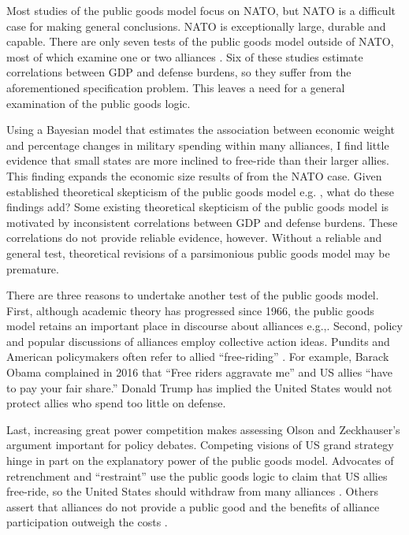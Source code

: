 \documentclass[12pt]{article}
\begin{document}
Most studies of the public goods model focus on NATO, but NATO is a difficult case for making general conclusions. 
NATO is exceptionally large, durable and capable. 
There are only seven tests of the public goods model outside of NATO, most of which examine one or two alliances \citep{Russett1970, Starr1974, Reisinger1983, Thies1987, ConybeareSandler1990, OnealWhatley1996, Siroky2012}. 
Six of these studies estimate correlations between GDP and defense burdens, so they suffer from the aforementioned specification problem.
This leaves a need for a general examination of the public goods logic. 


Using a Bayesian model that estimates the association between economic weight and percentage changes in military spending within many alliances, I find little evidence that small states are more inclined to free-ride than their larger allies.
This finding expands the economic size results of \citep{PluemperNeumayer2015} from the NATO case.
Given established theoretical skepticism of the public goods model e.g. \citep{Palmer1990, GatesTerasawa1992, SandlerHartley2001, Norrlof2010, NiouZeigler2019}, what do these findings add? 
Some existing theoretical skepticism of the public goods model is motivated by inconsistent correlations between GDP and defense burdens. 
These correlations do not provide reliable evidence, however. 
Without a reliable and general test, theoretical revisions of a parsimonious public goods model may be premature.


There are three reasons to undertake another test of the public goods model. 
First, although academic theory has progressed since 1966, the public goods model retains an important place in discourse about alliances e.g.,\citep{Walt1990, Sandler1993, Mearsheimer1994, Goldstein1995, SandlerHartley2001, Garfinkel2004, Walt2009, Norrlof2010, Barrett2010, PluemperNeumayer2015}.
Second, policy and popular discussions of alliances employ collective action ideas.
Pundits and American policymakers often refer to allied ``free-riding'' \citep{Lanoszka2015}.   
For example, Barack Obama complained in 2016 that ``Free riders aggravate me'' and US allies ``have to pay your fair share.'' 
Donald Trump has implied the United States would not protect allies who spend too little on defense. 


Last, increasing great power competition makes assessing Olson and Zeckhauser's argument important for policy debates. 
Competing visions of US grand strategy hinge in part on the explanatory power of the public goods model. 
Advocates of retrenchment and ``restraint'' use the public goods logic to claim that US allies free-ride, so the United States should withdraw from many alliances \citep{Preble2009, Posen2014}. 
Others assert that alliances do not provide a public good and the benefits of alliance participation outweigh the costs \citep{Brooksetal2013, BrandsFeaver2017}. 
\end{document}
